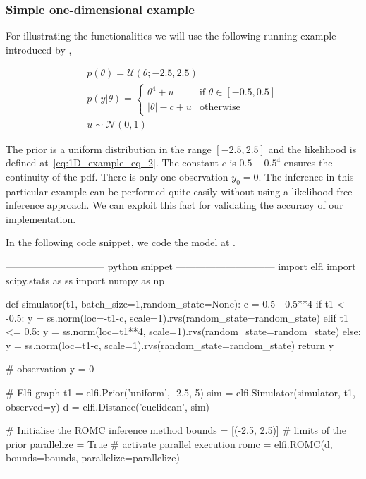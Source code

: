 \subsubsection*{Simple one-dimensional example}

For illustrating the functionalities we will use the following running
example introduced by \citet{Ikonomov2019},

\begin{gather} \label{eq:1D_example}
  p(\theta) = \mathcal{U}(\theta;-2.5,2.5)\\ \label{eq:1D_example_eq_2}
  p(y|\theta) = \left\{
    \begin{array}{ll} \theta^4 + u & \mbox{if } \theta \in [-0.5, 0.5]
\\ |\theta| - c + u & \mbox{otherwise}
    \end{array} \right.\\ 
  u \sim \mathcal{N}(0,1)
\end{gather}

\noindent

The prior is a uniform distribution in the range \([-2.5, 2.5]\) and
the likelihood is defined at~\ref{eq:1D_example_eq_2}. The constant
\(c\) is \(0.5 - 0.5^4\) ensures the continuity of the pdf. There is
only one observation \(y_0 = 0\). The inference in this particular
example can be performed quite easily without using a likelihood-free
inference approach. We can exploit this fact for validating the
accuracy of our implementation.

In the following code snippet, we code the model at .

\begin{Code}
------------------------------ python snippet ------------------------------
  import elfi
  import scipy.stats as ss
  import numpy as np

  def simulator(t1, batch_size=1,random_state=None):
    c = 0.5 - 0.5**4
    if t1 < -0.5:
        y = ss.norm(loc=-t1-c, scale=1).rvs(random_state=random_state)
    elif t1 <= 0.5:
        y = ss.norm(loc=t1**4, scale=1).rvs(random_state=random_state)
    else:
        y = ss.norm(loc=t1-c, scale=1).rvs(random_state=random_state)
    return y

  # observation
  y = 0

  # Elfi graph
  t1 = elfi.Prior('uniform', -2.5, 5)
  sim = elfi.Simulator(simulator, t1, observed=y)
  d = elfi.Distance('euclidean', sim)

  # Initialise the ROMC inference method
  bounds = [(-2.5, 2.5)] # limits of the prior
  parallelize = True # activate parallel execution
  romc = elfi.ROMC(d, bounds=bounds, parallelize=parallelize)
----------------------------------------------------------------------------
\end{Code}
